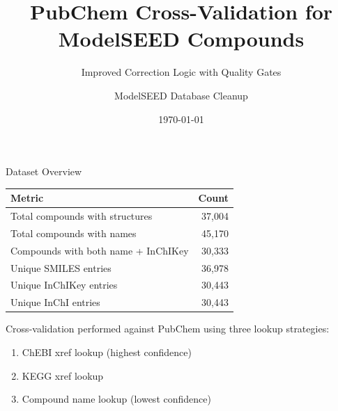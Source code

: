 \documentclass[aspectratio=169,11pt]{beamer}
\title{PubChem Cross-Validation for ModelSEED Compounds}
\subtitle{Improved Correction Logic with Quality Gates}
\author{ModelSEED Database Cleanup}
\date{\today}
\begin{document}
\begin{frame}
\titlepage
\end{frame}

\begin{frame}{Dataset Overview}

\begin{table}[h]
\centering
\begin{tabular}{lr}
\toprule
\textbf{Metric} & \textbf{Count} \\
\midrule
Total compounds with structures        & 37,004 \\
Total compounds with names             & 45,170 \\
Compounds with both name + InChIKey    & 30,333 \\
\midrule
Unique SMILES entries                  & 36,978 \\
Unique InChIKey entries                & 30,443 \\
Unique InChI entries                   & 30,443 \\
\bottomrule
\end{tabular}
\end{table}

\bigskip
Cross-validation performed against PubChem using three lookup strategies:
\begin{enumerate}
  \item ChEBI xref lookup (highest confidence)
  \item KEGG xref lookup
  \item Compound name lookup (lowest confidence)
\end{enumerate}

\end{frame}
\end{document}
